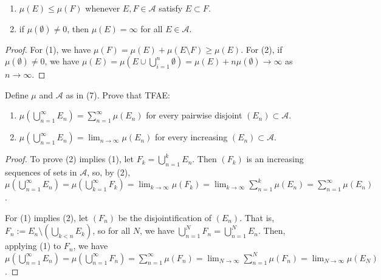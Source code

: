 \documentclass{article}
\newcommand{\A}{\mathcal{A}}
\begin{document}
\begin{enumerate}
\item $\mu(E) \le \mu(F)$ whenever $E,F \in\A$ satisfy $E \subset F$.
\item if $\mu(\emptyset) \ne 0$, then $\mu(E) = \infty$ for all $E \in\A$.
\end{enumerate}
\begin{proof}
For (1), we have $\mu(F) = \mu(E) + \mu(E\setminus F) \ge \mu(E)$.
For (2), if $\mu(\emptyset) \ne 0$, we have $\mu(E) = \mu(E \cup \bigcup_{i=1}^n \emptyset) = \mu(E) + n\mu(\emptyset) \to \infty$ as $n \to \infty$.
\end{proof}
 Define $\mu$ and $\A$ as in (7). Prove that TFAE:
\begin{enumerate}
\item $\mu(\bigcup_{n=1}^\infty E_n) = \sum_{n=1}^\infty \mu(E_n)$ for every pairwise disjoint $(E_n) \subset \A$.
\item $\mu(\bigcup_{n=1}^\infty E_n) = \lim_{n\to\infty} \mu(E_n)$ for every increasing $(E_n) \subset \A$.
\end{enumerate}
\begin{proof}
\begin{comment}

For (2) implies (1), in the case that $\sum_{n=1}^\infty \mu(E_n) = \infty$,  let $M > 0$.  Pick $N$ such that $\sum_{n=1}^N \mu(E_n) > M$. Then $\mu(\bigcup_{n=1}^\infty E_n) \ge \sum_{n=1}^M \mu(E_n) > M$.  Letting $M \to \infty$, we get the desired equality.

Now consider the case that $\sum_{n=1}^\infty \mu(E_n) < \infty$. We have $\mu(\bigcup_{n=1}^\infty E_n) \ge \mu(\bigcup_{n=1}^N E_n) =  \sum_{n=1}^N \mu(E_n) $. Letting $N \to\infty$, we get $\mu(\bigcup_{n=1}^\infty E_n) \ge \sum_{n=1}^\infty \mu(E_n)$.
\end{comment}
To prove (2) implies (1), let $F_k = \bigcup_{n=1}^k E_n$. Then $(F_k)$ is an increasing sequences of sets in $\A$, so, by (2), $\mu(\bigcup_{n=1}^\infty E_n) = \mu(\bigcup_{k=1}^\infty F_k)  = \lim_{k\to\infty} \mu(F_k) = \lim_{k\to\infty} \sum_{n=1}^k \mu(E_n) = \sum_{n=1}^\infty \mu(E_n)$.

For (1) implies (2), let $(F_n)$ be the disjointification of $(E_n)$.  That is, $F_n := E_n \setminus (\bigcup_{k<n} E_k)$, so for all $N$, we have $\bigcup_{n=1}^N F_n = \bigcup_{n=1}^N E_n$. Then, applying (1) to $F_n$, we have $\mu(\bigcup_{n=1}^\infty E_n) 
= \mu(\bigcup_{n=1}^\infty F_n) = \sum_{n=1}^\infty \mu(F_n) = \lim_{N\to\infty} \sum_{n=1}^N \mu(F_n) = \lim_{N\to\infty} \mu(E_N)$.
\end{proof}
\end{document}
